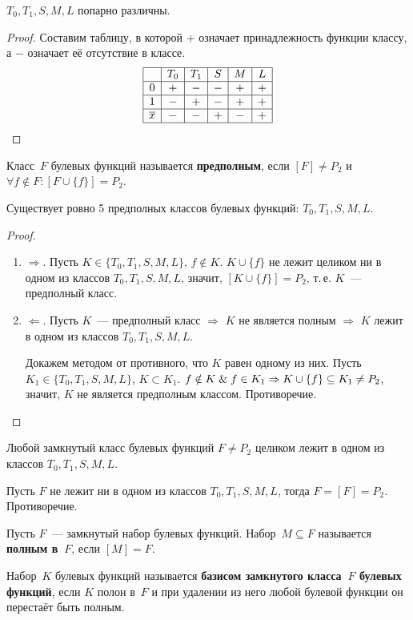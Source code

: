 \begin{statement}
$T_0, T_1, S, M, L$ попарно различны.
\end{statement}
\begin{proof}
Составим таблицу, в которой $+$ означает принадлежность функции классу, а $-$ означает её отсутствие в классе.
\begin{equation*}
\begin{array}{|c|c|c|c|c|c|}
\hline
  & T_0 & T_1 & S & M & L \\
\hline
0 & + & - & - & + & + \\
\hline
1 & - & + & - & + & + \\
\hline
\overline x & - & - & + & - & + \\
\hline
\end{array}
\end{equation*}
\end{proof}

Класс~$F$ булевых функций называется \textbf{предполным}, если $[F] \neq P_2$ и $\forall f \notin F \colon [F \cup \{ f \}] = P_2$.

\begin{statement}
Существует ровно 5 предполных классов булевых функций: $T_0, T_1, S, M, L$.
\end{statement}
\begin{proof}
\begin{enumerate}
	\item $\Rightarrow$. Пусть $K \in \{ T_0, T_1, S, M, L \}$, $f \notin K$.
	$K \cup \{ f \}$ не лежит целиком ни в одном из классов $T_0, T_1, S, M, L$, значит, $[K \cup \{ f \}] = P_2$, т.\,е. $K$~--- предполный класс.
	\item $\Leftarrow$. Пусть $K$~--- предполный класс $\Rightarrow$ $K$ не является полным $\Rightarrow$ $K$ лежит в одном из классов $T_0, T_1, S, M, L$.
	
	Докажем методом от противного, что $K$ равен одному из них.
	Пусть $K_1 \in \{ T_0, T_1, S, M, L \}$, $K \subset K_1$.
	$f \notin K \opbr\lAnd f \in K_1 \opbr\Rightarrow K \cup \{ f \} \subseteq K_1 \neq P_2$, значит, $K$ не является предполным классом.
	Противоречие.
\end{enumerate}
\end{proof}

\begin{consequent}
Любой замкнутый класс булевых функций $F \neq P_2$ целиком лежит в одном из классов $T_0, T_1, S, M, L$.
\end{consequent}
\begin{proofcontra}
Пусть $F$ не лежит ни в одном из классов $T_0, T_1, S, M, L$, тогда $F = [F] = P_2$.
Противоречие.
\end{proofcontra}

Пусть $F$~--- замкнутый набор булевых функций. Набор~$M \subseteq F$ называется \textbf{полным в~$F$}, если $[M] = F$.

 Набор~$K$ булевых функций называется \textbf{базисом замкнутого класса~$F$ булевых функций}, если $K$ полон в~$F$ и при удалении из него любой булевой функции он перестаёт быть полным.